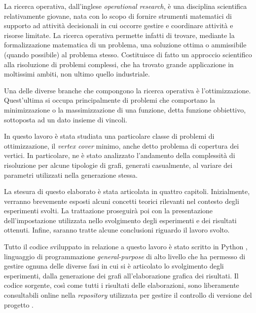 La ricerca operativa, dall'inglese \textit{operational research}, è una disciplina scientifica relativamente 
giovane, nata con lo scopo di fornire strumenti matematici di supporto ad attività decisionali in cui occorre gestire e coordinare 
attività e risorse limitate. La ricerca operativa permette infatti di trovare, mediante la formalizzazione 
matematica di un problema, una soluzione ottima o ammissibile (quando possibile) al problema stesso. 
Costituisce di fatto un approccio scientifico alla risoluzione di problemi 
complessi, che ha trovato grande applicazione in moltissimi ambiti, non ultimo quello industriale. 

Una delle diverse branche che compongono la ricerca operativa è l'ottimizzazione. 
Quest'ultima si occupa principalmente di problemi che comportano la minimizzazione o la massimizzazione di una funzione, detta funzione
obbiettivo, sottoposta ad un dato insieme di vincoli. 

In questo lavoro è stata studiata una particolare classe di problemi di ottimizzazione, il \textit{vertex cover} minimo, anche detto problema di copertura dei vertici. In particolare, ne è stato analizzato l'andamento della complessità di risoluzione per alcune tipologie di grafi, generati casualmente, al variare dei parametri utilizzati nella generazione stessa.

La stesura di questo elaborato è stata articolata in quattro capitoli. Inizialmente, verranno brevemente esposti alcuni concetti teorici rilevanti nel contesto degli 
esperimenti svolti. La trattazione proseguirà poi con la presentazione dell'impostazione utilizzata nello svolgimento degli
esperimenti e dei risultati ottenuti. Infine, saranno tratte alcune conclusioni riguardo il lavoro svolto. 

Tutto il codice sviluppato in relazione a questo lavoro è stato scritto in Python \cite{python}, linguaggio di programmazione \textit{general-purpose} di alto livello che ha permesso di gestire ognuna delle diverse fasi in cui si è articolato lo svolgimento degli esperimenti, dalla generazione dei grafi all'elaborazione grafica dei risultati. Il codice sorgente, così come tutti i risultati delle elaborazioni, sono liberamente consultabili online nella \textit{repository} utilizzata per gestire il controllo di versione del progetto \cite{repository}.